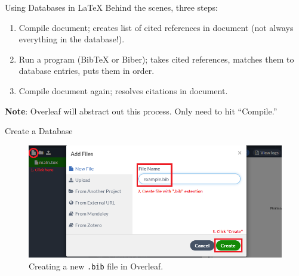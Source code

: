 \documentclass{beamer}
\begin{document}
{  

  \begin{frame}{Using Databases in \LaTeX}
    Behind the scenes, three steps:
    \begin{enumerate}
      \item Compile document; creates list of cited references in document (not always everything in the database!).
      \item Run a program (BibTeX or Biber); takes cited references, matches them to database entries, puts them in order.
      \item Compile document again; resolves citations in document.
    \end{enumerate}
    \textbf{Note}: Overleaf will abstract out this process. Only need to hit ``Compile.''
  \end{frame}

  \begin{frame}{Create a Database}
    \begin{figure}
      \includegraphics[width=0.8\linewidth]{day02-03A-database.png}
      \caption{Creating a new \texttt{.bib} file in Overleaf.}
      \label{fig:day02-03A}
    \end{figure}
  \end{frame}

}
\end{document}
